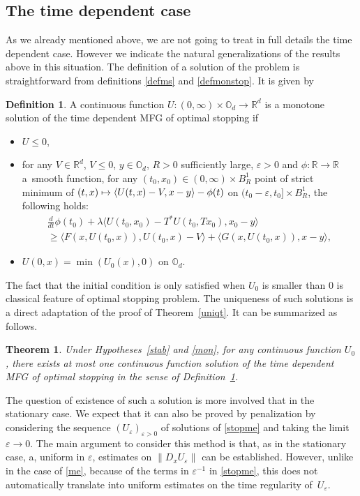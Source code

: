 \documentclass[JEP,XML,SOM,Unicode,NoEqCountersInSection,published]{cedram}
\newcommand\mto{\mathchoice{\longmapsto}{\mapsto}{\mapsto}{\mapsto}}
\let\epsilon\varepsilon
\newtheorem{Theorem}{Theorem}[section]
\theoremstyle{definition}
\newtheorem{Def}{Definition}[section]
\begin{document}
\subsection{The time dependent case}
As we already mentioned above, we are not going to treat in full details the time dependent case. However we indicate the natural generalizations of the results above in this situation. The definition of a solution of the problem is straightforward from definitions \ref{defms} and \ref{defmonstop}. It is given by
\begin{Def}\label{defmstopt}
A continuous function $U: (0,\infty)\times \mathbb{O}_d \to \mathbb{R}^d$ is a monotone solution of the time dependent MFG of optimal stopping if
\begin{itemize}
\item $U \leq 0$,
\item for any $V \in \mathbb{R}^d$, $V \leq 0$, $y \in \mathbb{O}_d$, $R> 0$ sufficiently large, $\epsilon > 0$ and $\phi: \mathbb{R} \to \mathbb{R}$ a~smooth function, for any $(t_0,x_0)\in (0,\infty) \times B^1_R$ point of strict minimum of $(t,x) \mto \langle U(t,x)-V, x-y\rangle-\phi(t)$ on $(t_0-\epsilon, t_0] \times B^1_R$, the following holds:
\begin{multline}\label{testtstop}
\frac{d}{dt} \phi(t_0) + \lambda \langle U(t_0,x_0)-T^*U(t_0,Tx_0),x_0-y \rangle \\
\geq
\langle F(x,U(t_0,x)), U(t_0,x)-V\rangle+\langle G(x,U(t_0,x)), x-y \rangle,
\end{multline}
\item
$U(0,x) = \min(U_0(x),0) \text{ on } \mathbb{O}_d$.
\end{itemize}
\end{Def}
The fact that the initial condition is only satisfied when $U_0$ is smaller than $0$ is classical feature of optimal stopping problem. The uniqueness of such solutions is a direct adaptation of the proof of Theorem~\ref{uniqt}. It can be summarized as follows.
\begin{Theorem}
Under Hypotheses~\ref{stab} and \ref{mon}, for any continuous function $U_0$, there exists at most one continuous function solution of the time dependent MFG of optimal stopping in the sense of Definition~\ref{defmstopt}.
\end{Theorem}
The question of existence of such a solution is more involved that in the stationary case. We expect that it can also be proved by penalization by considering the sequence $(U_{\epsilon})_{\epsilon > 0}$ of solutions of \eqref{stopme} and taking the limit $\epsilon \to 0$. The main argument to consider this method is that, as in the stationary case, a, uniform in $\epsilon$, estimates on $\|D_x U_{\epsilon}\|$ can be established. However, unlike in the case of \eqref{me}, because of the terms in $\epsilon^{-1}$ in \eqref{stopme}, this does not automatically translate into uniform estimates on the time regularity of~$U_{\epsilon}$.
\end{document}
